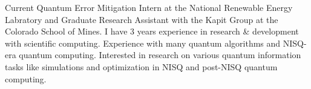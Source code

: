 

\begin{cvparagraph}

Current Quantum Error Mitigation Intern at the National Renewable Energy Labratory and Graduate Research Assistant with the Kapit Group at the Colorado School of Mines. I have 3 years experience in research \& development with scientific computing. Experience with many quantum algorithms and NISQ-era quantum computing. Interested in research on various quantum information tasks like simulations and optimization in NISQ and post-NISQ quantum computing.

\end{cvparagraph}
